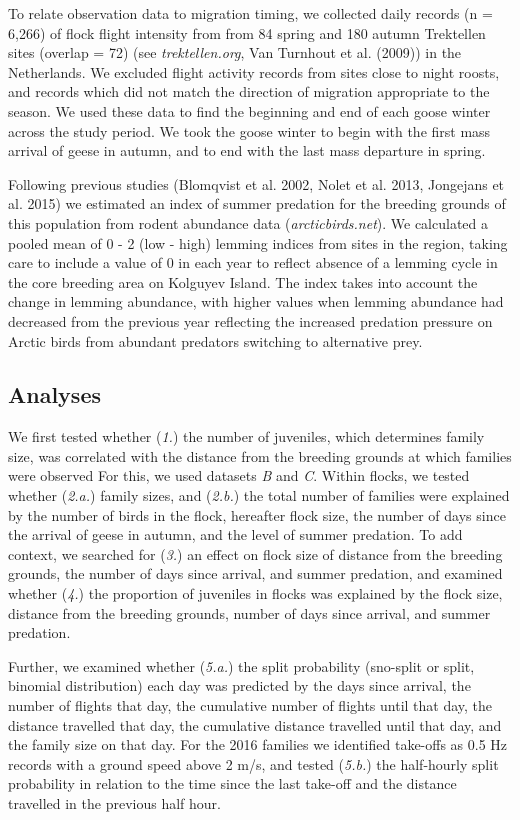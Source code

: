 \documentclass[10pt,twocolumn]{paper}
\begin{document}
To relate observation data to migration timing, we collected daily
records (n = 6,266) of flock flight intensity from from 84 spring and
180 autumn Trektellen sites (overlap = 72) (see \emph{trektellen.org},
Van Turnhout et al. (2009)) in the Netherlands. We excluded flight
activity records from sites close to night roosts, and records which did
not match the direction of migration appropriate to the season. We used
these data to find the beginning and end of each goose winter across the
study period. We took the goose winter to begin with the first mass
arrival of geese in autumn, and to end with the last mass departure in
spring.

Following previous studies (Blomqvist et al. 2002, Nolet et al. 2013,
Jongejans et al. 2015) we estimated an index of summer predation for the
breeding grounds of this population from rodent abundance data
(\emph{arcticbirds.net}). We calculated a pooled mean of 0 - 2 (low -
high) lemming indices from sites in the region, taking care to include a
value of 0 in each year to reflect absence of a lemming cycle in the
core breeding area on Kolguyev Island. The index takes into account the
change in lemming abundance, with higher values when lemming abundance
had decreased from the previous year reflecting the increased predation
pressure on Arctic birds from abundant predators switching to
alternative prey.

\subsection{Analyses}\label{analyses}

We first tested whether (\emph{1.}) the number of juveniles, which
determines family size, was correlated with the distance from the
breeding grounds at which families were observed For this, we used
datasets \emph{B} and \emph{C}. Within flocks, we tested whether
(\emph{2.a.}) family sizes, and (\emph{2.b.}) the total number of
families were explained by the number of birds in the flock, hereafter
flock size, the number of days since the arrival of geese in autumn, and
the level of summer predation. To add context, we searched for
(\emph{3.}) an effect on flock size of distance from the breeding
grounds, the number of days since arrival, and summer predation, and
examined whether (\emph{4.}) the proportion of juveniles in flocks was
explained by the flock size, distance from the breeding grounds, number
of days since arrival, and summer predation.

Further, we examined whether (\emph{5.a.}) the split probability
(sno-split or split, binomial distribution) each day was predicted by
the days since arrival, the number of flights that day, the cumulative
number of flights until that day, the distance travelled that day, the
cumulative distance travelled until that day, and the family size on
that day. For the 2016 families we identified take-offs as 0.5 Hz
records with a ground speed above 2 m/s, and tested (\emph{5.b.}) the
half-hourly split probability in relation to the time since the last
take-off and the distance travelled in the previous half hour.
\end{document}
